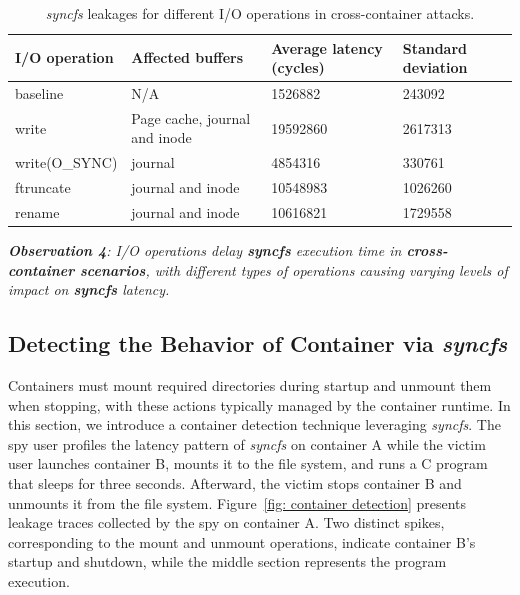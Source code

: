 \begin{table}[tb]
\caption{\textit{syncfs} leakages for different I/O operations in cross-container attacks.}
\small
\begin{tabular}{|L{2.2cm}|C{1.9cm}|C{1.3cm}|C{1.5cm}|}

\hline
\textbf{I/O operation}         & \textbf{Affected buffers}              & \textbf{Average latency (cycles)} & \textbf{Standard deviation} \\ \hline \hline
baseline  & N/A                                    & 1526882                           & 243092                      \\ \hline
write                          & Page cache, journal and inode   & 19592860                        & 2617313                    \\ \hline
write(O\_SYNC)                 & journal                          & 4854316                          & 330761                      \\ \hline
ftruncate                      & journal and inode              & 10548983                          & 1026260                     \\ \hline
rename                         & journal and inode           & 10616821                          & 1729558                     \\ \hline
\end{tabular}
\label{tb:latency_measurement_container}

\end{table}

\begin{tcolorbox}[colback=gray!10,colframe=black,boxrule=0.5pt,arc=2mm,outer arc=2mm,]
\textit{\textbf{Observation 4}: I/O operations delay \textbf{syncfs} execution time in \textbf{cross-container scenarios}, with different types of operations causing varying levels of impact on \textbf{syncfs} latency.}
\end{tcolorbox}

\subsection{Detecting the Behavior of Container via \textit{syncfs}} 

Containers must mount required directories during startup and unmount them when stopping, with these actions typically managed by the container runtime. In this section, we introduce a container detection technique leveraging \textit{syncfs}. The spy user profiles the latency pattern of \textit{syncfs} on container A while the victim user launches container B, mounts it to the file system, and runs a C program that sleeps for three seconds. Afterward, the victim stops container B and unmounts it from the file system. Figure~\ref{fig: container detection} presents leakage traces collected by the spy on container A. Two distinct spikes, corresponding to the mount and unmount operations, indicate container B's startup and shutdown, while the middle section represents the program execution.

